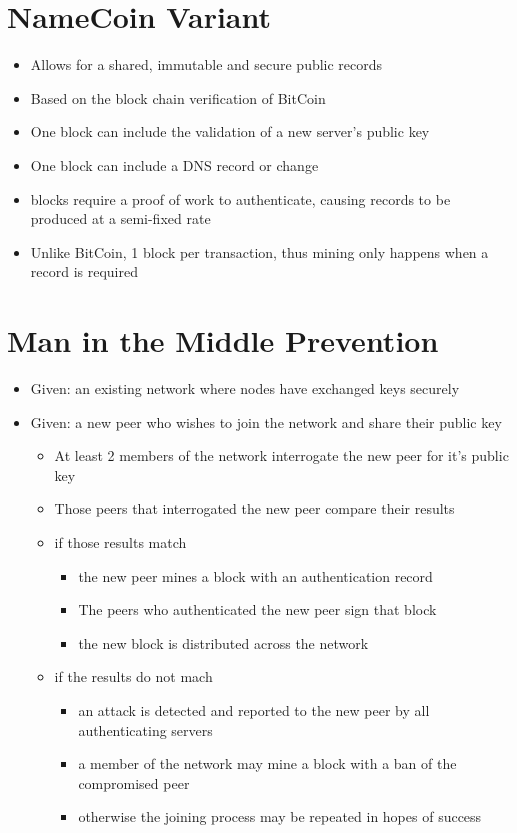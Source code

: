\documentclass{IEEEtran}
\begin{document}
\section{NameCoin Variant}
\begin{itemize}
\item{Allows for a shared, immutable and secure public records}
\item{Based on the block chain verification of BitCoin}
\item{One block can include the validation of a new server's public key}
\item{One block can include a DNS record or change}
\item{blocks require a proof of work to authenticate, causing records to be produced at a semi-fixed rate}
\item{Unlike BitCoin, 1 block per transaction, thus mining only happens when a record is required}
\end{itemize}

\section{Man in the Middle Prevention}
\begin{itemize}
        \item{Given: an existing network where nodes have exchanged keys securely}
        \item{Given: a new peer who wishes to join the network and share their public key}
        \begin{itemize}
                \item{At least 2 members of the network interrogate the new peer for it's public key}
                \item{Those peers that interrogated the new peer compare their results}
                \item{if those results match}
                \begin{itemize}
                        \item{the new peer mines a block with an authentication record}
                        \item{The peers who authenticated the new peer sign that block}
                        \item{the new block is distributed across the network}
                \end{itemize}
                \item{if the results do not mach}
                \begin{itemize}
                        \item{an attack is detected and reported to the new peer by all authenticating servers}
                        \item{a member of the network may mine a block with a ban of the compromised peer}
                        \item{otherwise the joining process may be repeated in hopes of success}
                \end{itemize}
        \end{itemize}
\end{itemize}
\end{document}
